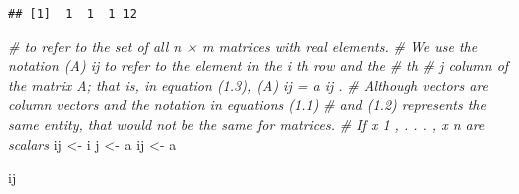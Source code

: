 \documentclass[
]{article}
\newenvironment{Shaded}{\begin{snugshade}}{\end{snugshade}}
\newcommand{\CommentTok}[1]{\textcolor[rgb]{0.56,0.35,0.01}{\textit{#1}}}
\newcommand{\NormalTok}[1]{#1}
\newcommand{\OtherTok}[1]{\textcolor[rgb]{0.56,0.35,0.01}{#1}}
\begin{document}
\begin{verbatim}
## [1]  1  1  1 12
\end{verbatim}

\begin{Shaded}
\begin{Highlighting}[]
\CommentTok{\# to refer to the set of all n × m matrices with real elements.}
\CommentTok{\# We use the notation (A) ij to refer to the element in the i th row and the}
\CommentTok{\# th}
\CommentTok{\# j column of the matrix A; that is, in equation (1.3), (A) ij = a ij .}
\CommentTok{\# Although vectors are column vectors and the notation in equations (1.1)}
\CommentTok{\# and (1.2) represents the same entity, that would not be the same for matrices.}
\CommentTok{\# If x 1 , . . . , x n are scalars}
\NormalTok{ij }\OtherTok{\textless{}{-}}\NormalTok{ i}
\NormalTok{j }\OtherTok{\textless{}{-}}\NormalTok{ a}
\NormalTok{ij }\OtherTok{\textless{}{-}}\NormalTok{ a}

\NormalTok{ij}
\end{Highlighting}
\end{Shaded}
\end{document}
